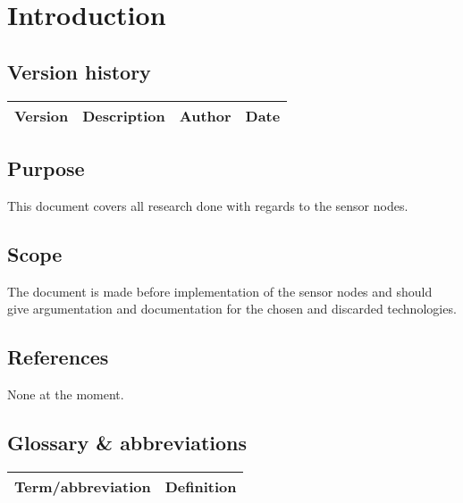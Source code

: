 \chapter{Introduction}
\section{Version history}
\begin{table}[H]
\begin{tabular}{|c|p{9cm}|c|c|}
\hline
Version & Description & Author & Date\\
\hline
\end{tabular}
\end{table}

\section{Purpose}
This document covers all research done with regards to the sensor nodes.

\section{Scope}
The document is made before implementation of the sensor nodes and should give argumentation and documentation for the chosen and discarded technologies.

\section{References}
None at the moment.

\section{Glossary \& abbreviations}
\begin{table}[H]
\centering
\begin{tabular}{|p{4cm}|p{7cm}|}
\hline
Term/abbreviation & Definition\\ \hline
\end{tabular}
\end{table}
